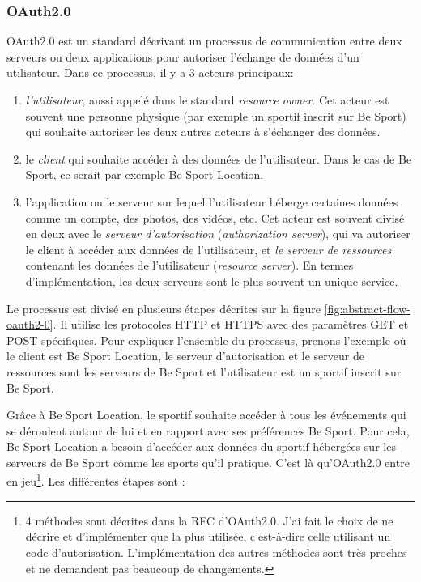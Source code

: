\subsubsection*{OAuth2.0}

OAuth2.0 est un standard décrivant un processus de communication entre deux
serveurs ou deux applications pour autoriser l'échange de données d'un
utilisateur. Dans ce processus, il y a 3 acteurs principaux:

\begin{enumerate}
  \item \emph{l'utilisateur}, aussi appelé dans le standard \emph{resource
owner}. Cet acteur est souvent une personne physique (par exemple
    un sportif inscrit sur Be Sport) qui souhaite autoriser les deux autres
    acteurs à s'échanger des données.
  \item le \emph{client} qui souhaite accéder à des données de l'utilisateur.
    Dans le cas de Be Sport, ce serait par exemple Be Sport Location.
  \item l'application ou le serveur sur lequel l'utilisateur héberge certaines
    données comme un compte, des photos, des vidéos, etc. Cet acteur est souvent
    divisé en deux avec le \emph{serveur d'autorisation} (\emph{authorization
      server}), qui va autoriser le client à accéder aux données de l'utilisateur,
    et \emph{le serveur de ressources} contenant les données de l'utilisateur
(\emph{resource server}). En termes d'implémentation, les deux serveurs sont le
plus souvent un unique service.
\end{enumerate}

Le processus est divisé en plusieurs étapes décrites sur la figure
\ref{fig:abstract-flow-oauth2-0}. Il utilise les protocoles HTTP et HTTPS avec des
paramètres GET et POST spécifiques. Pour expliquer l'ensemble du processus, prenons l'exemple où
le client est Be Sport Location, le serveur d'autorisation et le serveur de
ressources sont les serveurs de Be Sport et l'utilisateur est un sportif inscrit
sur Be Sport.

Grâce à Be Sport Location, le sportif souhaite accéder à tous les événements qui
se déroulent autour de lui et en rapport avec ses préférences Be Sport.
Pour cela, Be Sport Location a besoin d'accéder aux données du sportif hébergées
sur les serveurs de Be Sport comme les sports qu'il pratique. C'est là
qu'OAuth2.0 entre en jeu\footnote{4 méthodes sont décrites dans la RFC
  d'OAuth2.0. J'ai fait le choix de ne décrire et d'implémenter que la plus utilisée,
  c'est-à-dire celle utilisant un code d'autorisation. L'implémentation des
  autres méthodes sont très proches et ne demandent pas beaucoup de changements.}. Les différentes étapes sont :

